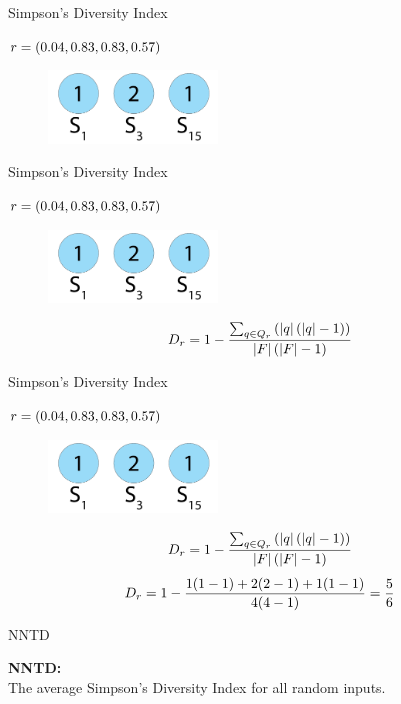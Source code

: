 \begin{frame}{Simpson's Diversity Index}
\begin{center}
$r = (0.04, 0.83, 0.83, 0.57)$
  \begin{figure}[p]
  \includegraphics[width=0.4\textwidth]{images/speciessize.png}
  \end{figure}
\end{center}
\end{frame}

\begin{frame}{Simpson's Diversity Index}
\begin{center}
$r = (0.04, 0.83, 0.83, 0.57)$
  \begin{figure}[p]
  \includegraphics[width=0.4\textwidth]{images/speciessize.png}
  \end{figure}
\begin{equation}
D_{r} = 1 - \frac{\sum_{q \in Q_{r}}\left(\lvert q\rvert\left(\lvert q\rvert - 1\right)\right)}{\lvert F\rvert\left(\lvert F\rvert - 1\right)}
\end{equation}
\end{center}
\end{frame}

\begin{frame}{Simpson's Diversity Index}
\begin{center}
$r = (0.04, 0.83, 0.83, 0.57)$
  \begin{figure}[p]
  \includegraphics[width=0.4\textwidth]{images/speciessize.png}
  \end{figure}
\begin{equation}
D_{r} = 1 - \frac{\sum_{q \in Q_{r}}\left(\lvert q\rvert\left(\lvert q\rvert - 1\right)\right)}{\lvert F\rvert\left(\lvert F\rvert - 1\right)}
\end{equation}
\begin{equation}\label{eq:nntd}
D_{r} = 1 - \frac{1(1-1)+2(2-1)+1(1-1)}{4(4-1)} = \frac{5}{6}
\end{equation}
\end{center}
\end{frame}

\begin{frame}{NNTD}
\begin{center}
\textbf{NNTD:}\\
The average Simpson's Diversity Index for all random inputs.
\end{center}
\end{frame}





